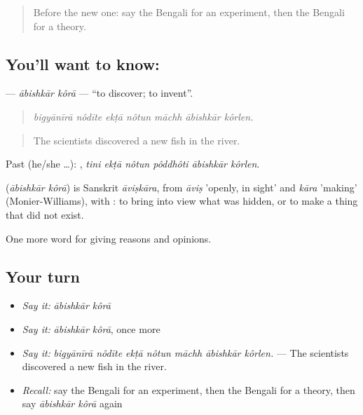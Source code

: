 \label{lesson:BN-C354-abishkar-kora}



\begin{quote}
Before the new one: say the Bengali for an experiment, then the Bengali for a theory.
\end{quote}

\subsection*{You'll want to know:  }
\textbf{ } — \emph{ābishkār kôrā} — \textquotedblleft{}to discover; to invent\textquotedblright{}.

\begin{quote}
      
\end{quote}

\begin{quote}
\emph{bigyānīrā nôdīte ekṭā nôtun māchh ābishkār kôrlen.}
\end{quote}

\begin{quote}
The scientists discovered a new fish in the river.
\end{quote}

Past (he/she …):      , \emph{tini ekṭā nôtun pôddhôti ābishkār kôrlen}.

\begin{cousinweb}
\textbf{ } (\emph{ābishkār kôrā}) is Sanskrit \emph{āviṣkāra}, from \emph{āviṣ} 'openly, in sight' and \emph{kāra} 'making' (Monier-Williams), with : to bring into view what was hidden, or to make a thing that did not exist.
\end{cousinweb}

\begin{grammarlens}[title={What you've built}]
One more word for giving reasons and opinions.
\end{grammarlens}

\subsection*{Your turn}
\begin{itemize}
\raggedright
  \item \emph{Say it:} \emph{ābishkār kôrā}
  \item \emph{Say it:} \emph{ābishkār kôrā}, once more
  \item \emph{Say it:} \emph{bigyānīrā nôdīte ekṭā nôtun māchh ābishkār kôrlen.} — The scientists discovered a new fish in the river.
  \item \emph{Recall:} say the Bengali for an experiment, then the Bengali for a theory, then say \emph{ābishkār kôrā} again
\end{itemize}

